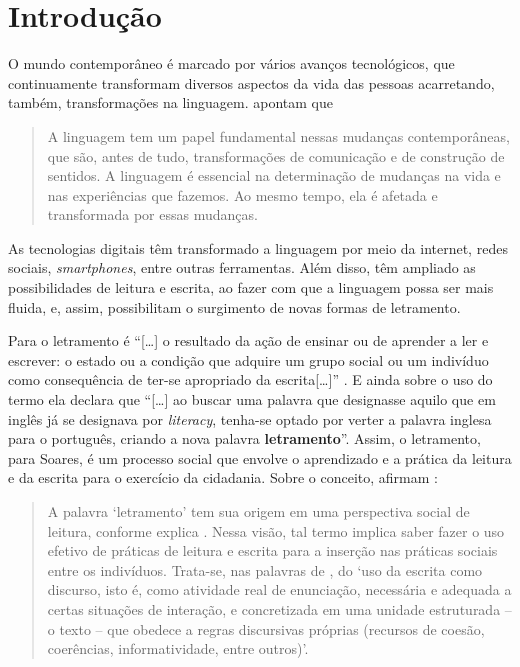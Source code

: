 \section{Introdução}\label{sec-intro}

O mundo contemporâneo é marcado por vários avanços tecnológicos, que
continuamente transformam diversos aspectos da vida das pessoas
acarretando, também, transformações na linguagem. \textcite[p.~13]{barton2015linguagem}
apontam que

\begin{quote}
A linguagem tem um papel fundamental nessas mudanças contemporâneas, que
são, antes de tudo, transformações de comunicação e de construção de
sentidos. A linguagem é essencial na determinação de mudanças na vida e
nas experiências que fazemos. Ao mesmo tempo, ela é afetada e
transformada por essas mudanças.
\end{quote}

As tecnologias digitais têm transformado a linguagem por meio da
internet, redes sociais, \emph{smartphones}, entre outras ferramentas.
Além disso, têm ampliado as possibilidades de leitura e escrita, ao
fazer com que a linguagem possa ser mais fluida, e, assim, possibilitam
o surgimento de novas formas de letramento.

Para \textcite{soares2006letramento} o letramento é ``{[}\ldots{]} o resultado da ação de
ensinar ou de aprender a ler e escrever: o estado ou a condição que
adquire um grupo social ou um indivíduo como consequência de ter-se
apropriado da escrita{[}\ldots{]}'' \cite[p. 18]{soares2006letramento}. E ainda sobre o
uso do termo ela declara que ``{[}\ldots{]} ao buscar uma palavra que
designasse aquilo que em inglês já se designava por \emph{literacy},
tenha-se optado por verter a palavra inglesa para o português, criando a
nova palavra \textbf{letramento}''\cite[p.~18, grifo do autor]{soares2006letramento}. Assim, o letramento, para Soares, é um processo
social que envolve o aprendizado e a prática da leitura e da escrita
para o exercício da cidadania. Sobre o conceito, afirmam \textcite[p.~33]{alves2023alfabetizacao}:

\begin{quote}
    A palavra ‘letramento’ tem sua origem em uma perspectiva social de leitura, conforme explica \textcite{soares2020A-alfabetizacao,soares2020C-alfabetar}. Nessa visão, tal termo implica saber fazer o uso efetivo de práticas de leitura e escrita para a inserção nas práticas sociais entre os indivíduos. Trata-se, nas palavras de \textcite[p.~79]{soares2020A-alfabetizacao}, do ‘uso da escrita como discurso, isto é, como atividade real de enunciação, necessária e adequada a certas situações de interação, e concretizada em uma unidade estruturada – o texto – que obedece a regras discursivas próprias (recursos de coesão, coerências, informatividade, entre outros)’.
\end{quote}

